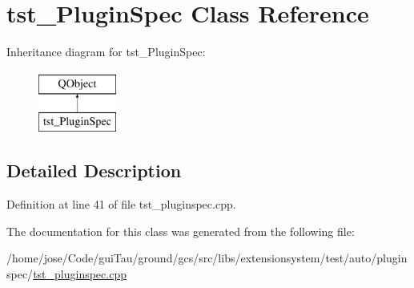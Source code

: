 \hypertarget{classtst___plugin_spec}{\section{tst\-\_\-\-Plugin\-Spec Class Reference}
\label{classtst___plugin_spec}
}
Inheritance diagram for tst\-\_\-\-Plugin\-Spec\-:\begin{figure}[H]
\begin{center}
\leavevmode
\includegraphics[height=2.000000cm]{classtst___plugin_spec}
\end{center}
\end{figure}


\subsection{Detailed Description}


Definition at line 41 of file tst\-\_\-pluginspec.\-cpp.



The documentation for this class was generated from the following file\-:\begin{DoxyCompactItemize}
\item 
/home/jose/\-Code/gui\-Tau/ground/gcs/src/libs/extensionsystem/test/auto/pluginspec/\hyperlink{tst__pluginspec_8cpp}{tst\-\_\-pluginspec.\-cpp}\end{DoxyCompactItemize}
